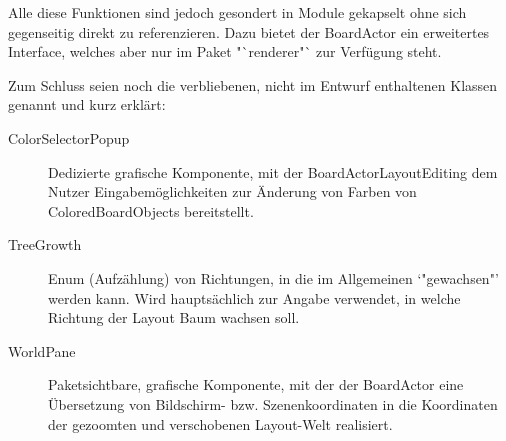 Alle diese Funktionen sind jedoch gesondert in Module gekapselt ohne sich gegenseitig direkt zu referenzieren.
Dazu bietet der BoardActor ein erweitertes Interface, welches aber nur im Paket "`renderer"` zur Verfügung steht.


Zum Schluss seien noch die verbliebenen, nicht im Entwurf enthaltenen Klassen genannt und kurz erklärt:
\begin{description}
\item[ColorSelectorPopup]
	Dedizierte grafische Komponente, mit der BoardActorLayoutEditing dem Nutzer Eingabemöglichkeiten zur Änderung von Farben von ColoredBoardObjects bereitstellt.
\item[TreeGrowth]
	Enum (Aufzählung) von Richtungen, in die im Allgemeinen `"gewachsen"' werden kann. 
	Wird hauptsächlich zur Angabe verwendet, in welche Richtung der Layout Baum wachsen soll.
\item[WorldPane]
	Paketsichtbare, grafische Komponente, mit der der BoardActor eine Übersetzung von Bildschirm- bzw. Szenenkoordinaten in die Koordinaten der gezoomten und verschobenen Layout-Welt realisiert.
\end{description}
